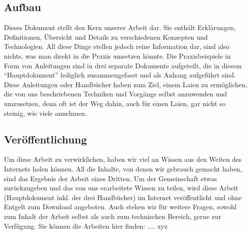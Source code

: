 \subsection{Aufbau}
Dieses Dokument stellt den Kern unserer Arbeit dar. Sie enthält Erklärungen, Definitionen, Übersicht und Details zu verschiedenen Konzepten und Technologien. All diese Dinge stellen jedoch reine Information dar, sind also nichts, was man direkt in die Praxis umsetzen könnte. Die Praxisbeispiele in Form von Anleitungen sind in drei separate Dokumente aufgeteilt, die in diesem ``Hauptdokument'' lediglich zusammengefasst und als Anhang aufgeführt sind. Diese Anleitungen oder Handbücher haben zum Ziel, einem Laien zu ermöglichen, die von uns beschriebenen Techniken und Vorgänge selbst anzuwenden und umzusetzen, denn oft ist der Weg dahin, auch für einen Laien, gar nicht so steinig, wie viele annehmen.

\subsection{Veröffentlichung}
Um diese Arbeit zu verwirklichen, haben wir viel an Wissen aus den Weiten des Internets holen können. All die Inhalte, von denen wir gebrauch gemacht haben, sind das Ergebnis der Arbeit eines Dritten. Um der Gemeinschaft etwas zurückzugeben und das von uns erarbeitete Wissen zu teilen, wird diese Arbeit (Hauptdokument inkl. der drei Handbücher) im Internet veröffentlicht und ohne Entgelt zum Download angeboten. Auch stehen wir für weitere Fragen, sowohl zum Inhalt der Arbeit selbst als auch zum technischen Bereich, gerne zur Verfügung.
Sie können die Arbeiten hier finden: .... xyz
